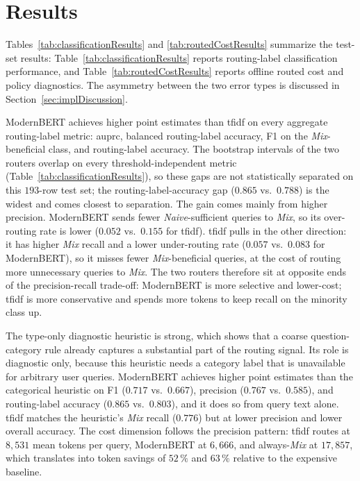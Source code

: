 \documentclass[english, bibtex]{kththesis}               %
\numberwithin{listing}{chapter}
\begin{document}
\section{Results}
\label{sec:implResults}

Tables~\ref{tab:classificationResults} and \ref{tab:routedCostResults} summarize the test-set results: Table~\ref{tab:classificationResults} reports routing-label classification performance, and Table~\ref{tab:routedCostResults} reports offline routed cost and policy diagnostics. The asymmetry between the two error types is discussed in Section~\ref{sec:implDiscussion}.

ModernBERT achieves higher point estimates than \gls{tfidf} on every aggregate routing-label metric: \gls{auprc}, balanced routing-label accuracy, F1 on the \emph{Mix}-beneficial class, and routing-label accuracy. The bootstrap intervals of the two routers overlap on every threshold-independent metric (Table~\ref{tab:classificationResults}), so these gaps are not statistically separated on this $193$-row test set; the routing-label-accuracy gap ($0.865$ vs.\ $0.788$) is the widest and comes closest to separation. The gain comes mainly from higher precision. ModernBERT sends fewer \emph{Naive}-sufficient queries to \emph{Mix}, so its over-routing rate is lower ($0.052$ vs.\ $0.155$ for \gls{tfidf}). \gls{tfidf} pulls in the other direction: it has higher \emph{Mix} recall and a lower under-routing rate ($0.057$ vs.\ $0.083$ for ModernBERT), so it misses fewer \emph{Mix}-beneficial queries, at the cost of routing more unnecessary queries to \emph{Mix}. The two routers therefore sit at opposite ends of the precision-recall trade-off: ModernBERT is more selective and lower-cost; \gls{tfidf} is more conservative and spends more tokens to keep recall on the minority class up.

The type-only diagnostic heuristic is strong, which shows that a coarse question-category rule already captures a substantial part of the routing signal. Its role is diagnostic only, because this heuristic needs a category label that is unavailable for arbitrary user queries. ModernBERT achieves higher point estimates than the categorical heuristic on F1 ($0.717$ vs.\ $0.667$), precision ($0.767$ vs.\ $0.585$), and routing-label accuracy ($0.865$ vs.\ $0.803$), and it does so from query text alone. \gls{tfidf} matches the heuristic's \emph{Mix} recall ($0.776$) but at lower precision and lower overall accuracy. The cost dimension follows the precision pattern: \gls{tfidf} routes at $8{,}531$ mean tokens per query, ModernBERT at $6{,}666$, and always-\emph{Mix} at $17{,}857$, which translates into token savings of $52\,\%$ and $63\,\%$ relative to the expensive baseline.
\end{document}
